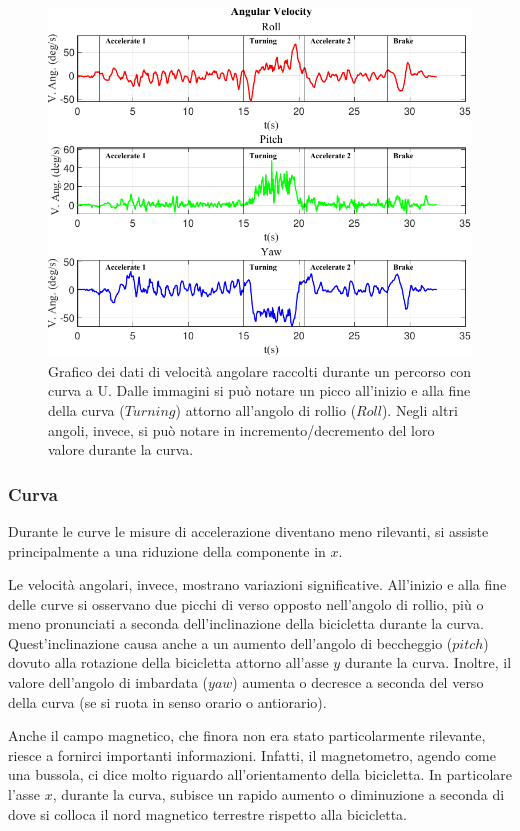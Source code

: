\documentclass[class=article]{standalone}
\begin{document}
	\begin{center}
		\begin{figure}[h]
			\centering\includegraphics[width=.9\textwidth]{img/VAng CurvaUF.pdf}
			\caption[]{Grafico dei dati di velocità angolare raccolti durante un percorso con curva a U. Dalle immagini si può notare un picco all'inizio e alla fine della curva (\(Turning\)) attorno all'angolo di rollio (\(Roll\)). Negli altri angoli, invece, si può notare in incremento/decremento del loro valore durante la curva.}
			\label{fig:VAngCurvaU}
		\end{figure}
	\end{center}
	
	
	\subsubsection{Curva}	
	Durante le curve le misure di accelerazione diventano meno rilevanti, si assiste principalmente a una riduzione della componente in \(x\).
	
	Le velocità angolari, invece, mostrano variazioni significative. All'inizio e alla fine delle curve si osservano due picchi di verso opposto nell'angolo di rollio, più o meno pronunciati a seconda dell'inclinazione della bicicletta durante la curva.
	Quest'inclinazione causa anche a un aumento dell'angolo di beccheggio (\(pitch\)) dovuto alla rotazione della bicicletta attorno all'asse \(y\) durante la curva.
	Inoltre, il valore dell'angolo di imbardata (\(yaw\)) aumenta o decresce a seconda del verso della curva (se si ruota in senso orario o antiorario).
		
	Anche il campo magnetico, che finora non era stato particolarmente rilevante, riesce a fornirci importanti informazioni. Infatti, il magnetometro, agendo come una bussola, ci dice molto riguardo all'orientamento della bicicletta. In particolare l'asse \(x\), durante la curva, subisce un rapido aumento o diminuzione a seconda di dove si colloca il nord magnetico terrestre rispetto alla bicicletta.
	
\end{document}
